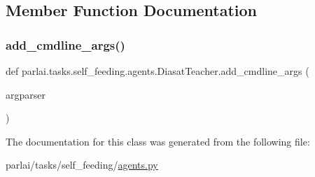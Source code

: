 \subsection{Member Function Documentation}
\mbox{\label{classparlai_1_1tasks_1_1self__feeding_1_1agents_1_1DiasatTeacher_a28eadfed974fe247525076406032e7ec}} 
\subsubsection{\texorpdfstring{add\+\_\+cmdline\+\_\+args()}{add\_cmdline\_args()}}
{\footnotesize\ttfamily def parlai.\+tasks.\+self\+\_\+feeding.\+agents.\+Diasat\+Teacher.\+add\+\_\+cmdline\+\_\+args (\begin{DoxyParamCaption}\item[{}]{argparser }\end{DoxyParamCaption})\hspace{0.3cm}{\ttfamily [static]}}



The documentation for this class was generated from the following file\+:\begin{DoxyCompactItemize}
\item 
parlai/tasks/self\+\_\+feeding/\hyperlink{parlai_2tasks_2self__feeding_2agents_8py}{agents.\+py}\end{DoxyCompactItemize}
